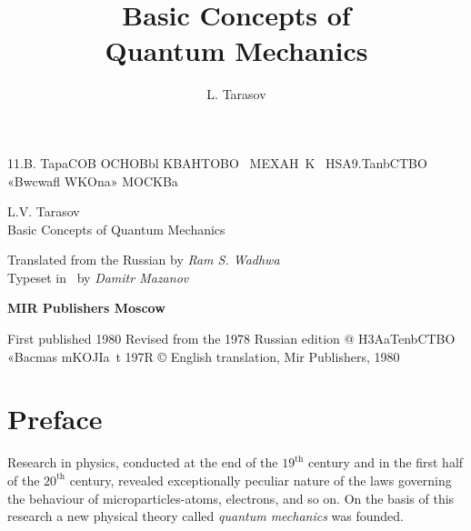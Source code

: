 \documentclass[a4paper,sfsidenotes,colorlinks=true]{tufte-book}
\title{Basic Concepts of \\ Quantum Mechanics}
\author{L. Tarasov}
\date{}
\numberwithin{equation}{section}
\numberwithin{figure}{section}
\begin{document}
\maketitle
\frontmatter
11.B. TapaCOB
OCHOBbl
KBAHTOBO~ MEXAH~K~
HSA9.TanbCTBO «Bwcwafl WKOna» MOCKBa
\newpage
\thispagestyle{empty}
\begin{fullwidth}
\noindent

\begin{Huge}
\textsf{L.V. Tarasov\\
Basic Concepts of Quantum Mechanics}\\
\end{Huge}
\vspace{1cm}
\begin{Large}
Translated from the Russian by \emph{Ram S. Wadhwa}\\[15pt]
Typeset in \XeLaTeX  \,  by \emph{Damitr Mazanov}
\end{Large}
\vspace{6cm}
\begin{center}
\begin{Huge}
\textbf{MIR Publishers Moscow}
\end{Huge}
\end{center}
\end{fullwidth}
\cleardoublepage
First published 1980 Revised from the 1978 Russian edition
@ H3AaTenbCTBO «Bacmas mKOJIa~t 197R © English translation, Mir Publishers, 1980
\setcounter{tocdepth}{3}
\tableofcontents


\chapter*{Preface}
{}

Research in physics, conducted at the end of the $19^{\text{th}}$ century and in the first half of the $20^{\text{th}}$ century, revealed exceptionally peculiar nature of the laws governing the behaviour of microparticles-atoms, electrons, and so on. On the basis of this research a new physical theory called \emph{quantum mechanics} was founded. 
\end{document}

